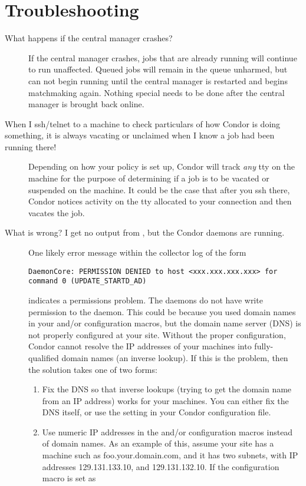 \section{Troubleshooting}

\begin{description}
\item[What happens if the central manager crashes?]

If the central manager crashes, jobs that are already running will
continue to run unaffected.
Queued jobs will remain in the queue unharmed, but can not begin
running until the central manager is restarted and begins matchmaking
again.
Nothing special needs to be done after the central manager is brought
back online.

\item[When I ssh/telnet to a machine to check particulars of how
Condor is doing something, it is always vacating or unclaimed when I
know a job had been running there!]

Depending on how your policy is set up, Condor will track \emph{any} tty
on the machine for the purpose of determining if a job is to be vacated
or suspended on the machine. It could be the case that after you ssh
there, Condor notices activity on the tty allocated to your connection
and then vacates the job.


\item[What is wrong? I get no output from , but the Condor daemons are running.]

One likely error message within the collector log of the form
\begin{verbatim}
DaemonCore: PERMISSION DENIED to host <xxx.xxx.xxx.xxx> for command 0 (UPDATE_STARTD_AD)
\end{verbatim}
indicates a permissions problem.
The  daemons do not have write permission to the
 daemon.
This could be because
you used domain names in your  and/or
 configuration macros,
but the domain name server (DNS) is not properly configured at your site.
Without the proper configuration, Condor cannot resolve
the IP addresses of your machines
into fully-qualified domain names (an inverse lookup).
If this is the problem, then the solution takes one of two forms:
\begin{enumerate}
\item Fix the DNS so that inverse lookups (trying to get the domain name
   from an IP address) works for your machines.  You can
   either fix the DNS itself,
   or use the  setting in your Condor
         configuration file.
\item Use numeric IP addresses in the  and/or
    configuration macros
   instead of domain names.
   As an example of this, assume your site has a machine such as
   foo.your.domain.com, and it has two subnets, with IP addresses
   129.131.133.10, and 129.131.132.10.
   If the configuration macro is set as 


\end{enumerate}
\end{description}
